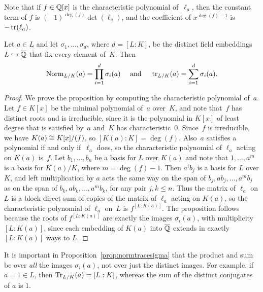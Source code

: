 Note that if $f\in\mathbb{Q}[x]$ is the characteristic polynomial of~$\ell_a$,
then the constant term of $f$ is $(-1)^{\deg(f)}\det(\ell_a)$, and the
coefficient of $x^{\deg(f)-1}$ is $-\operatorname{tr}(\ell_a)$.

\begin{proposition}\label{prop:normtracesigma}
Let $a\in L$ and let $\sigma_1,\ldots, \sigma_d$, where $d=[L:K]$, be
the distinct field embeddings $L\hookrightarrow \overline{\mathbb{Q}}$ that fix every element
of~$K$.  Then
$$
\operatorname{Norm}_{L/K}(a) = \prod_{i=1}^d \sigma_i(a)
\quad\text{ and }\quad
\operatorname{tr}_{L/K}(a) = \sum_{i=1}^d \sigma_i(a).
$$
\end{proposition}
\begin{proof}
  We prove the proposition by computing the characteristic
  polynomial of~$a$.  Let $f\in K[x]$ be the minimal polynomial
  of~$a$ over~$K$, and note that~$f$ has distinct roots and is
  irreducible, since it is the polynomial in $K[x]$ of least degree
  that is satisfied by~$a$ and~$K$ has characteristic~$0$.  Since~$f$
  is irreducible, we have $K(a) \cong K[x]/(f)$, so $[K(a):K]=\deg(f)$.
  Also~$a$ satisfies a polynomial if and only if~$\ell_a$ does, so the
  characteristic polynomial of $\ell_a$ acting on $K(a)$ is~$f$.  Let
  $b_1,\ldots,b_n$ be a basis for $L$ over $K(a)$ and note that
  $1,\ldots, a^m$ is a basis for $K(a)/K$, where $m=\deg(f)-1$.  Then
  $a^i b_j$ is a basis for $L$ over $K$, and left multiplication by
  $a$ acts the same way on the span of $b_j, a b_j, \ldots, a^m b_j$
  as on the span of $b_k, a b_k, \ldots, a^m b_k$, for any pair $j,
  k\leq n$.  Thus the matrix of $\ell_a$ on $L$ is a block direct sum
  of copies of the matrix of $\ell_a$ acting on $K(a)$, so the
  characteristic polynomial of $\ell_a$ on~$L$ is $f^{[L:K(a)]}$.  The
  proposition follows because the roots of $f^{[L:K(a)]}$ are exactly
  the images $\sigma_i(a)$, with multiplicity $[L:K(a)]$, since each
  embedding of $K(a)$ into $\overline{\mathbb{Q}}$ extends in exactly $[L:K(a)]$ ways
  to $L$.
\end{proof}

It is important in Proposition~\ref{prop:normtracesigma} that
the product and sum be over {\em all} the images $\sigma_i(a)$,
not over just the distinct images.  For example, if $a=1\in L$, then
$\operatorname{Tr}_{L/K}(a) = [L:K]$, whereas the sum of the distinct conjugates
of $a$ is $1$.

